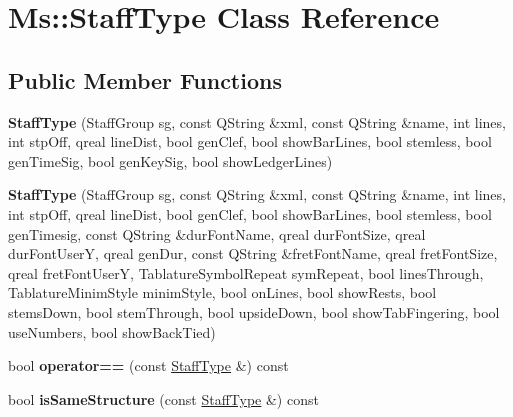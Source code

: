 \hypertarget{class_ms_1_1_staff_type}{}\section{Ms\+:\+:Staff\+Type Class Reference}
\label{class_ms_1_1_staff_type}
\subsection*{Public Member Functions}
\begin{DoxyCompactItemize}
\item 
\mbox{\label{class_ms_1_1_staff_type_ad6386c7a91963f987c9e7465aa628b00}} 
{\bfseries Staff\+Type} (Staff\+Group sg, const Q\+String \&xml, const Q\+String \&name, int lines, int stp\+Off, qreal line\+Dist, bool gen\+Clef, bool show\+Bar\+Lines, bool stemless, bool gen\+Time\+Sig, bool gen\+Key\+Sig, bool show\+Ledger\+Lines)
\item 
\mbox{\label{class_ms_1_1_staff_type_a0aa53d9bfe1a204b4a940353b02c54bb}} 
{\bfseries Staff\+Type} (Staff\+Group sg, const Q\+String \&xml, const Q\+String \&name, int lines, int stp\+Off, qreal line\+Dist, bool gen\+Clef, bool show\+Bar\+Lines, bool stemless, bool gen\+Timesig, const Q\+String \&dur\+Font\+Name, qreal dur\+Font\+Size, qreal dur\+Font\+UserY, qreal gen\+Dur, const Q\+String \&fret\+Font\+Name, qreal fret\+Font\+Size, qreal fret\+Font\+UserY, Tablature\+Symbol\+Repeat sym\+Repeat, bool lines\+Through, Tablature\+Minim\+Style minim\+Style, bool on\+Lines, bool show\+Rests, bool stems\+Down, bool stem\+Through, bool upside\+Down, bool show\+Tab\+Fingering, bool use\+Numbers, bool show\+Back\+Tied)
\item 
\mbox{\label{class_ms_1_1_staff_type_ab4af8b071e54433d1bca536e863b26d3}} 
bool {\bfseries operator==} (const \hyperlink{class_ms_1_1_staff_type}{Staff\+Type} \&) const
\item 
\mbox{\label{class_ms_1_1_staff_type_a2e7efb4dffb1f78220bbf3d1e0d40720}} 
bool {\bfseries is\+Same\+Structure} (const \hyperlink{class_ms_1_1_staff_type}{Staff\+Type} \&) const
\item 
\mbox{\label{class_ms_1_1_staff_type_a1a40800649c217eaaaa2a0dbb82f8e35}} 

\end{DoxyCompactItemize}
